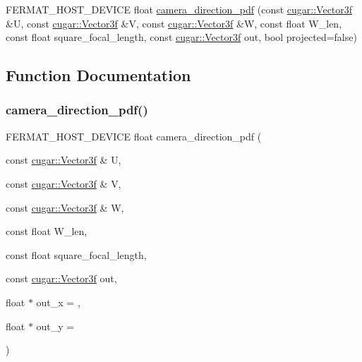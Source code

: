 \begin{DoxyCompactItemize}
\item 
F\+E\+R\+M\+A\+T\+\_\+\+H\+O\+S\+T\+\_\+\+D\+E\+V\+I\+CE float \hyperlink{group___camera_module_gadec496beaacfcaa8c49eea4217ee4476}{camera\+\_\+direction\+\_\+pdf} (const \hyperlink{structcugar_1_1_vector}{cugar\+::\+Vector3f} \&U, const \hyperlink{structcugar_1_1_vector}{cugar\+::\+Vector3f} \&V, const \hyperlink{structcugar_1_1_vector}{cugar\+::\+Vector3f} \&W, const float W\+\_\+len, const float square\+\_\+focal\+\_\+length, const \hyperlink{structcugar_1_1_vector}{cugar\+::\+Vector3f} out, bool projected=false)
\end{DoxyCompactItemize}


\subsection{Function Documentation}
\mbox{\label{group___camera_module_ga68d204cd13420430192f50fa6b0db5c2}} 
\subsubsection{\texorpdfstring{camera\+\_\+direction\+\_\+pdf()}{camera\_direction\_pdf()}\hspace{0.1cm}{\footnotesize\ttfamily [1/2]}}
{\footnotesize\ttfamily F\+E\+R\+M\+A\+T\+\_\+\+H\+O\+S\+T\+\_\+\+D\+E\+V\+I\+CE float camera\+\_\+direction\+\_\+pdf (\begin{DoxyParamCaption}\item[{const \hyperlink{structcugar_1_1_vector}{cugar\+::\+Vector3f} \&}]{U,  }\item[{const \hyperlink{structcugar_1_1_vector}{cugar\+::\+Vector3f} \&}]{V,  }\item[{const \hyperlink{structcugar_1_1_vector}{cugar\+::\+Vector3f} \&}]{W,  }\item[{const float}]{W\+\_\+len,  }\item[{const float}]{square\+\_\+focal\+\_\+length,  }\item[{const \hyperlink{structcugar_1_1_vector}{cugar\+::\+Vector3f}}]{out,  }\item[{float $\ast$}]{out\+\_\+x = {},  }\item[{float $\ast$}]{out\+\_\+y = {} }\end{DoxyParamCaption})\hspace{0.3cm}{\ttfamily [inline]}}

